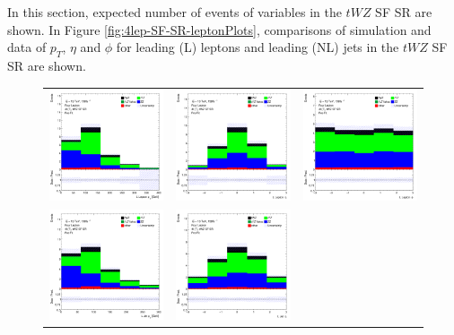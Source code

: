 In this section, expected number of events of variables in the $tWZ$ SF SR are shown. In Figure \ref{fig:4lep-SF-SR-leptonPlots}, comparisons of simulation and data of $p_{T}$, $\eta$ and $\phi$ for leading (L) leptons and leading (NL) jets in the $tWZ$ SF SR are shown.
\begin{figure}[htbp]
\centering
  \begin{tabular}{ccc}


    \includegraphics[width=.25\textwidth]{figures/PreFitPlots/lep4_tWZ_4T_SF_L_lepton_pt.png} &
    \includegraphics[width=.25\textwidth]{figures/PreFitPlots/lep4_tWZ_4T_SF_L_lepton_eta.png} &
    \includegraphics[width=.25\textwidth]{figures/PreFitPlots/lep4_tWZ_4T_SF_L_lepton_phi.png} \\
    \includegraphics[width=.25\textwidth]{figures/PreFitPlots/lep4_tWZ_4T_SF_LJet_pt.png} &
    \includegraphics[width=.25\textwidth]{figures/PreFitPlots/lep4_tWZ_4T_SF_LJet_eta.png} &

\end{tabular}
\end{figure}
